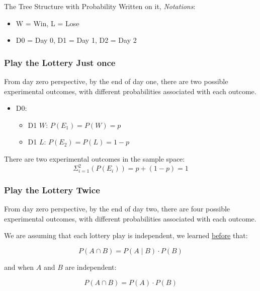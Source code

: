 \documentclass[
]{book}
\providecommand{\tightlist}{%
  \setlength{\itemsep}{0pt}\setlength{\parskip}{0pt}}
\begin{document}
The Tree Structure with Probability Written on it, \emph{Notations}:

\begin{itemize}
\tightlist
\item
  W = Win, L = Lose
\item
  D0 = Day 0, D1 = Day 1, D2 = Day 2
\end{itemize}

\hypertarget{play-the-lottery-just-once}{%
\subsubsection{Play the Lottery Just once}\label{play-the-lottery-just-once}}

From day zero perspective, by the end of day one, there are two possible experimental outcomes, with different probabilities associated with each outcome.

\begin{itemize}
\tightlist
\item
  D0:

  \begin{itemize}
  \tightlist
  \item
    D1 \(W\): \(P(E_1) = P(W) = p\)
  \item
    D1 \(L\): \(P(E_2) = P(L) = 1-p\)
  \end{itemize}
\end{itemize}

There are two experimental outcomes in the sample space:
\[\Sigma_{i=1}^2 \left(P\left(E_i\right)\right) = p + \left(1-p\right) = 1\]

\hypertarget{play-the-lottery-twice}{%
\subsubsection{Play the Lottery Twice}\label{play-the-lottery-twice}}

From day zero perspective, by the end of day two, there are four possible experimental outcomes, with different probabilities associated with each outcome.

We are assuming that each lottery play is independent, we learned \href{https://fanwangecon.github.io/Stat4Econ/probability/htmlpdfr/samplespace.html}{before} that:

\[ P(A \cap B) = P (A \mid B)\cdot P(B)\]

and when \(A\) and \(B\) are independent:

\[ P(A \cap B) = P (A)\cdot P(B)\]
\end{document}

